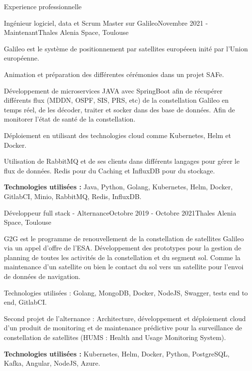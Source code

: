 \documentclass[
	11pt, %
]{resume} %
\begin{document}

\begin{rSection}{Experience professionnelle}

	\begin{rSubsection}{Ingénieur logiciel, data et Scrum Master sur Galileo}{Novembre 2021 - Maintenant}{Thales Alenia Space, Toulouse}{}
 		\item Galileo est le système de positionnement par satellites européeen inité par l'Union européenne. 
		\item Animation et préparation des différentes cérémonies dans un projet SAFe.
		\item Développement de microservices JAVA avec SpringBoot afin de récupérer différents flux (MDDN, OSPF, SIS, PRS, etc) de la constellation Galileo en temps réel, de les décoder, traiter et socker dans des base de données. Afin de monitorer l'état de santé de la constellation. 
 		\item Déploiement en utilisant des technologies cloud comme Kubernetes, Helm et Docker.
 		\item Utilisation de RabbitMQ et de ses clients dans différents langages pour gérer le flux de données. Redis pour du Caching et InfluxDB pour du stockage.
		\item \textbf{Technologies utilisées : }Java, Python, Golang, Kubernetes, Helm, Docker, GitlabCI, Minio, RabbitMQ, Redis, InfluxDB.
	\end{rSubsection}

	\begin{rSubsection}{Développeur full stack - Alternance}{Octobre 2019 - Octobre 2021}{Thales Alenia Space, Toulouse}{}
 		\item G2G est le programme de renouvellement de la constellation de satellites Galileo via un appel d'offre de l'ESA. 
			Développement des prototypes pour la gestion de planning de toutes les activités de la constellation et du segment sol. 
			Comme la maintenance d'un satellite ou bien le contact du sol vers un satellite pour l'envoi de données de navigation.
 		\item Technologies utilisées : Golang, MongoDB, Docker, NodeJS, Swagger, tests end to end, GitlabCI.
 		\item Second projet de l'alternance : Architecture, développement et déploiement cloud d'un produit de monitoring et de maintenance prédictive 
			pour la surveillance de constellation de satellites (HUMS : Health and Usage Monitoring System).
		\item \textbf{Technologies utilisées :} Kubernetes, Helm, Docker, Python, PostgreSQL, Kafka, Angular, NodeJS, Azure.
	\end{rSubsection}


\end{rSection}
\end{document}
